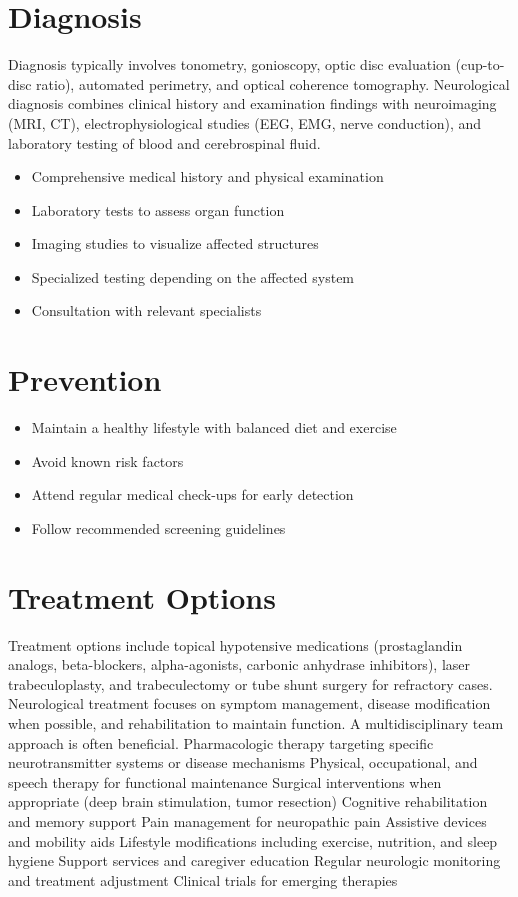 \section{Diagnosis}
Diagnosis typically involves tonometry, gonioscopy, optic disc evaluation (cup-to-disc ratio), automated perimetry, and optical coherence tomography. Neurological diagnosis combines clinical history and examination findings with neuroimaging (MRI, CT), electrophysiological studies (EEG, EMG, nerve conduction), and laboratory testing of blood and cerebrospinal fluid.

\begin{itemize}[noitemsep]
  \item Comprehensive medical history and physical examination
  \item Laboratory tests to assess organ function
  \item Imaging studies to visualize affected structures
  \item Specialized testing depending on the affected system
  \item Consultation with relevant specialists
\end{itemize}
\section{Prevention}
\begin{itemize}[noitemsep]
  \item Maintain a healthy lifestyle with balanced diet and exercise
  \item Avoid known risk factors
  \item Attend regular medical check-ups for early detection
  \item Follow recommended screening guidelines
\end{itemize}
\section{Treatment Options}
Treatment options include topical hypotensive medications (prostaglandin analogs, beta-blockers, alpha-agonists, carbonic anhydrase inhibitors), laser trabeculoplasty, and trabeculectomy or tube shunt surgery for refractory cases. Neurological treatment focuses on symptom management, disease modification when possible, and rehabilitation to maintain function. A multidisciplinary team approach is often beneficial. Pharmacologic therapy targeting specific neurotransmitter systems or disease mechanisms Physical, occupational, and speech therapy for functional maintenance Surgical interventions when appropriate (deep brain stimulation, tumor resection) Cognitive rehabilitation and memory support Pain management for neuropathic pain Assistive devices and mobility aids Lifestyle modifications including exercise, nutrition, and sleep hygiene Support services and caregiver education Regular neurologic monitoring and treatment adjustment Clinical trials for emerging therapies

